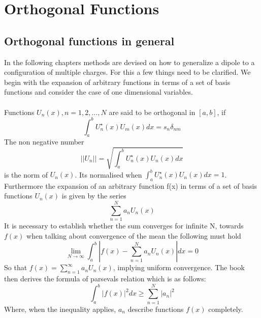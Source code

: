\section{Orthogonal Functions}
\subsection{Orthogonal functions in general}
In the following chapters methods are devised on how to generalize a dipole to a configuration of multiple charges.
For this a few things need to be clarified. We begin with the expansion of arbitrary functions in terms of a set of basis functions and consider the case of one dimensional variables.\\
\\
\noindent Functions $\displaystyle U_n(x), n = 1,2,...,N$ are said to be orthogonal in $[a,b]$, if 
\begin{equation}
    \int_a^b U_n^\star(x)U_m(x) dx = s_n \delta_{nm}
\end{equation}
The non negative number 
\begin{equation}
    ||U_n|| = \sqrt{\int_a^b U_n^\star (x) U_n(x) dx }
\end{equation}
is the norm of $U_n(x)$. Its normalised when $ \displaystyle \int_a^b U_n^\star (x) U_n(x) dx =1$.
Furthermore the expansion of an arbitrary function f(x) in terms of a set of basis functions ${U_n(x)}$ is given by the series
\begin{equation}
    \sum_{n=1}^N a_nU_n(x)
\end{equation}
It is necessary to establish whether the sum converges for infinite N, towards $f(x)$ when talking about convergence of the mean the following must hold
\begin{equation}
    \lim_{N \rightarrow \infty} \int_a^b | f(x) - \sum_{n=1}^N a_nU_n(x)|  dx = 0
\end{equation}
So that $\displaystyle f(x) = \sum_{n=1}^\infty a_nU_n(x)$, implying uniform convergence. The book then derives the formula of parsevals relation which is as follows:
\begin{equation}
    \int_a^b |f(x)|^2dx \geq \sum_{n=1}^N|a_n|^2
\end{equation}
Where, when the inequality applies, $a_n$  describe functions $f(x)$ completely.

